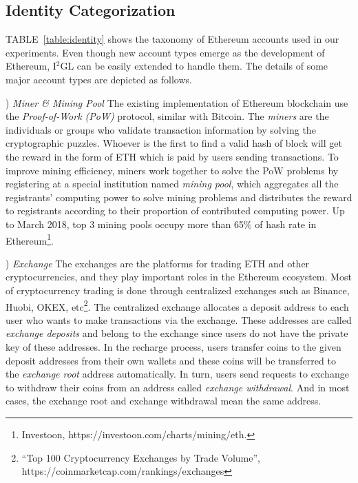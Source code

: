 \subsection{Identity Categorization}
TABLE~\ref{table:identity} shows the taxonomy of Ethereum accounts used in our experiments. Even though new account types emerge as the development of Ethereum, I$^2$GL can be easily extended to handle them. The details of some major account types are depicted as follows.

) \emph{Miner \& Mining Pool}
The existing implementation of Ethereum blockchain use the \emph{Proof-of-Work (PoW)} protocol, similar with Bitcoin. The \emph{miners} are the individuals or groups who validate transaction information by solving the cryptographic puzzles. Whoever is the first to find a valid hash of block will get the reward in the form of ETH which is paid by users sending transactions. To improve mining efficiency, miners work together to solve the PoW problems by registering at a special institution named \emph{mining pool}, which aggregates all the registrants' computing power to solve mining problems and distributes the reward to registrants according to their proportion of contributed computing power. Up to March 2018, top $3$ mining pools occupy more than 65\% of hash rate in Ethereum\footnote{Investoon, https://investoon.com/charts/mining/eth.}.

) \emph{Exchange}
The exchanges are the platforms for trading ETH and other cryptocurrencies, and they play important roles in the Ethereum ecosystem. Most of cryptocurrency trading is done through centralized exchanges such as Binance, Huobi, OKEX, etc\footnote{``Top 100 Cryptocurrency Exchanges by Trade Volume'', https://coinmarketcap.com/rankings/exchanges}. The centralized exchange allocates a deposit address to each user who wants to make transactions via the exchange. These addresses are called \emph{exchange deposits} and belong to the exchange since users do not have the private key of these addresses. In the recharge process, users transfer coins to the given deposit addresses from their own wallets and these coins will be transferred to the \emph{exchange root} address automatically. In turn, users send requests to exchange to withdraw their coins from an address called \emph{exchange withdrawal}. And in most cases, the exchange root and exchange withdrawal mean the same address.

